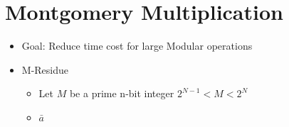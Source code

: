 \section{Montgomery Multiplication}
\begin{itemize}
\item Goal: Reduce time cost for large Modular operations
\item M-Residue
    \begin{itemize}
    \item Let $M$ be a prime n-bit integer $2^{N-1} < M < 2^N$
    \item $\bar{a}$
    \end{itemize}
\end{itemize}